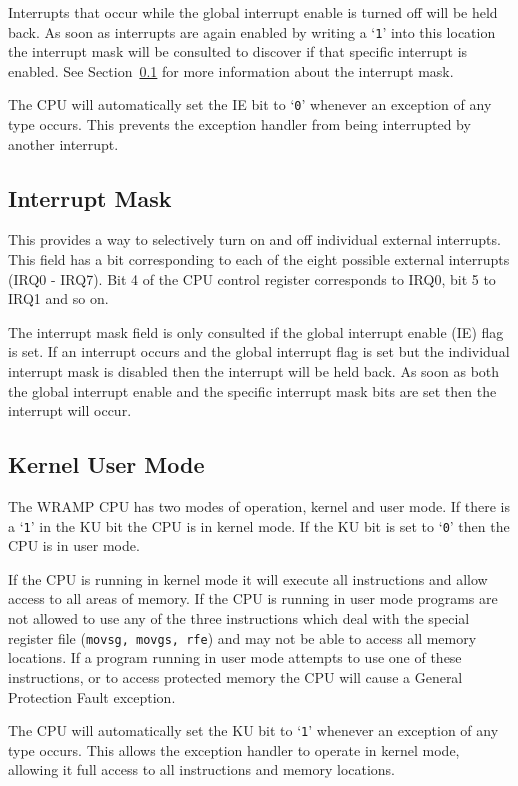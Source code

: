 \documentclass[a4paper,10pt]{article}
\begin{document}
Interrupts that occur while the global interrupt enable is turned off
will be held back. As soon as interrupts are again enabled by writing
a `\texttt{1}' into this location the interrupt mask will be consulted
to discover if that specific interrupt is enabled. See
Section~\ref{sec:imask} for more information about the interrupt mask.

The CPU will automatically set the IE bit to `\texttt{0}' whenever an
exception of any type occurs. This prevents the exception handler
from being interrupted by another interrupt.

\subsection{Interrupt Mask}
\label{sec:imask}

This provides a way to selectively turn on and off individual external
interrupts. This field has a bit corresponding to each of the eight
possible external interrupts (IRQ0 - IRQ7). Bit 4 of the CPU control
register corresponds to IRQ0, bit 5 to IRQ1 and so on.

The interrupt mask field is only consulted if the global interrupt
enable (IE) flag is set. If an interrupt occurs and the global
interrupt flag is set but the individual interrupt mask is disabled
then the interrupt will be held back. As soon as both the global
interrupt enable and the specific interrupt mask bits are set then the
interrupt will occur.

\subsection{Kernel User Mode}

The WRAMP CPU has two modes of operation, kernel and user mode. If
there is a `\texttt{1}' in the KU bit the CPU is in kernel mode. If
the KU bit is set to `\texttt{0}' then the CPU is in user mode. 

If the CPU is running in kernel mode it will execute all instructions and
allow access to all areas of memory. If the CPU is running in user
mode programs are not allowed to use any of the three instructions
which deal with the special register file (\texttt{movsg, movgs, rfe})
and may not be able to access all memory locations. If a program
running in user mode attempts to use one of these instructions, or to
access protected memory the CPU will cause a General Protection Fault
exception.

The CPU will automatically set the KU bit to `\texttt{1}' whenever an
exception of any type occurs. This allows the exception handler to
operate in kernel mode, allowing it full access to all instructions
and memory locations.
\end{document}
